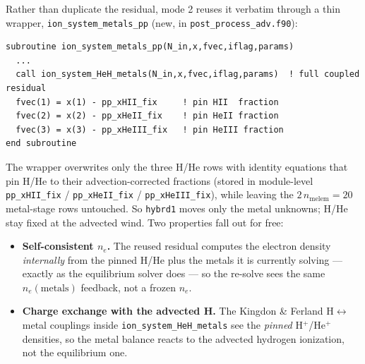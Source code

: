 \documentclass[english,a4paper]{kiseon_memo}
\begin{document}
Rather than duplicate the residual, mode 2 reuses it verbatim through a thin
wrapper, \texttt{ion\_system\_metals\_pp} (new, in
\texttt{post\_process\_adv.f90}):
\begin{lstlisting}
subroutine ion_system_metals_pp(N_in,x,fvec,iflag,params)
  ...
  call ion_system_HeH_metals(N_in,x,fvec,iflag,params)  ! full coupled residual
  fvec(1) = x(1) - pp_xHII_fix     ! pin HII  fraction
  fvec(2) = x(2) - pp_xHeII_fix    ! pin HeII fraction
  fvec(3) = x(3) - pp_xHeIII_fix   ! pin HeIII fraction
end subroutine
\end{lstlisting}
The wrapper overwrites only the three H/He rows with identity equations that pin
H/He to their advection-corrected fractions (stored in module-level
\texttt{pp\_xHII\_fix} / \texttt{pp\_xHeII\_fix} / \texttt{pp\_xHeIII\_fix}),
while leaving the \(2\,n_{\mathrm{melem}} = 20\) metal-stage rows untouched. So
\texttt{hybrd1} moves only the metal unknowns; H/He stay fixed at the advected
wind. Two properties fall out for free:
\begin{itemize}
  \item \textbf{Self-consistent \(n_e\).} The reused residual computes the
    electron density \emph{internally} from the pinned H/He plus the metals it is
    currently solving --- exactly as the equilibrium solver does --- so the
    re-solve sees the same \(n_e(\text{metals})\) feedback, not a frozen \(n_e\).
  \item \textbf{Charge exchange with the advected H.} The Kingdon \& Ferland
    H\(\leftrightarrow\)metal couplings inside \texttt{ion\_system\_HeH\_metals}
    see the \emph{pinned} H\(^+\)/He\(^+\) densities, so the metal balance reacts
    to the advected hydrogen ionization, not the equilibrium one.
\end{itemize}
\end{document}
